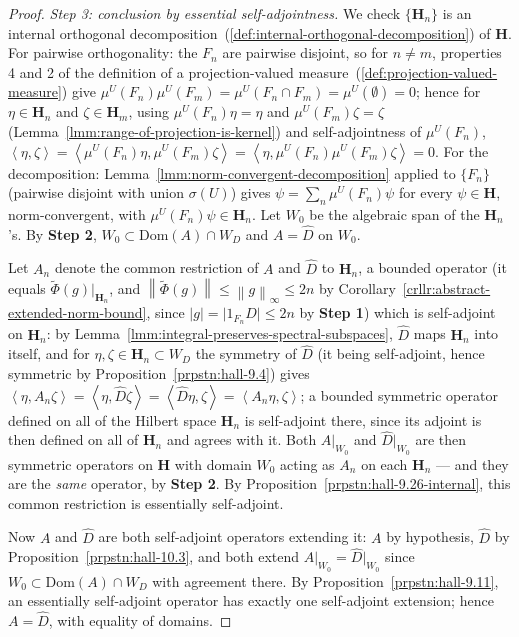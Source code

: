 \begin{proof}
\textit{Step 3: conclusion by essential self-adjointness.} We check $\{\mathbf{H}_n\}$ is an internal orthogonal decomposition~(\ref{def:internal-orthogonal-decomposition}) of $\mathbf{H}$. For pairwise orthogonality: the $F_n$ are pairwise disjoint, so for $n \ne m$, properties 4 and 2 of the definition of a projection-valued measure~(\ref{def:projection-valued-measure}) give $\mu^U(F_n)\mu^U(F_m) = \mu^U(F_n \cap F_m) = \mu^U(\emptyset) = 0$; hence for $\eta \in \mathbf{H}_n$ and $\zeta \in \mathbf{H}_m$, using $\mu^U(F_n)\eta = \eta$ and $\mu^U(F_m)\zeta = \zeta$ (Lemma~\ref{lmm:range-of-projection-is-kernel}) and self-adjointness of $\mu^U(F_n)$, $\left< \eta,\zeta \right> = \left< \mu^U(F_n)\eta, \mu^U(F_m)\zeta \right> = \left< \eta, \mu^U(F_n)\mu^U(F_m)\zeta \right> = 0$. For the decomposition: Lemma~\ref{lmm:norm-convergent-decomposition} applied to $\{F_n\}$ (pairwise disjoint with union $\sigma(U)$) gives $\psi = \sum_n \mu^U(F_n)\psi$ for every $\psi \in \mathbf{H}$, norm-convergent, with $\mu^U(F_n)\psi \in \mathbf{H}_n$. Let $W_0$ be the algebraic span of the $\mathbf{H}_n$'s. By \textbf{Step 2}, $W_0 \subset \text{Dom}(A) \cap W_D$ and $A = \widehat{D}$ on $W_0$.

Let $A_n$ denote the common restriction of $A$ and $\widehat D$ to $\mathbf{H}_n$, a bounded operator (it equals $\widetilde\Phi(g)\vert_{\mathbf{H}_n}$, and $\left\| \widetilde\Phi(g) \right\| \le \left\| g \right\|_\infty \le 2n$ by Corollary~\ref{crllr:abstract-extended-norm-bound}, since $\lvert g \rvert = \lvert 1_{F_n} D \rvert \le 2n$ by \textbf{Step 1}) which is self-adjoint on $\mathbf{H}_n$: by Lemma~\ref{lmm:integral-preserves-spectral-subspaces}, $\widehat{D}$ maps $\mathbf{H}_n$ into itself, and for $\eta,\zeta \in \mathbf{H}_n \subset W_D$ the symmetry of $\widehat D$ (it being self-adjoint, hence symmetric by Proposition~\ref{prpstn:hall-9.4}) gives $\left< \eta, A_n\zeta \right> = \left< \eta, \widehat D\zeta \right> = \left< \widehat D\eta, \zeta \right> = \left< A_n\eta, \zeta \right>$; a bounded symmetric operator defined on all of the Hilbert space $\mathbf{H}_n$ is self-adjoint there, since its adjoint is then defined on all of $\mathbf{H}_n$ and agrees with it. Both $A\vert_{W_0}$ and $\widehat{D}\vert_{W_0}$ are then symmetric operators on $\mathbf{H}$ with domain $W_0$ acting as $A_n$ on each $\mathbf{H}_n$ — and they are the \textit{same} operator, by \textbf{Step 2}. By Proposition~\ref{prpstn:hall-9.26-internal}, this common restriction is essentially self-adjoint.

Now $A$ and $\widehat{D}$ are both self-adjoint operators extending it: $A$ by hypothesis, $\widehat{D}$ by Proposition~\ref{prpstn:hall-10.3}, and both extend $A\vert_{W_0} = \widehat D\vert_{W_0}$ since $W_0 \subset \text{Dom}(A)\cap W_D$ with agreement there. By Proposition~\ref{prpstn:hall-9.11}, an essentially self-adjoint operator has exactly one self-adjoint extension; hence $A = \widehat{D}$, with equality of domains.
\end{proof}

